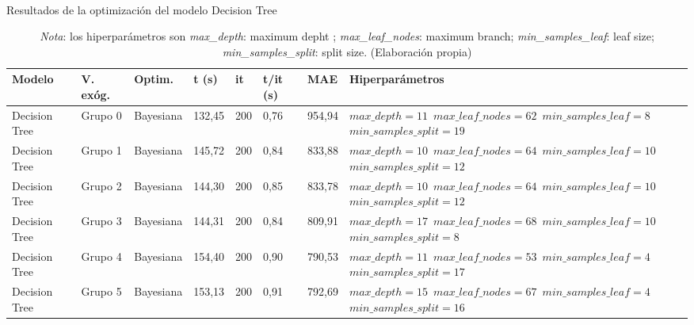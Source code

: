 \documentclass[12pt,a4paper]{report}
\begin{document}
\begin{table}[H]
\centering
\caption{\\ Resultados de la optimización del modelo Decision Tree}
\scriptsize
\begin{tabular}{m{1cm} m{1.2cm} m{1.2cm} m{1cm} m{1cm} m{1.2cm} m{1.2cm} m{3.5cm}} 
\toprule
\textbf{Modelo} & \textbf{V. exóg.} & \textbf{Optim.} & \textbf{t (s)} & \textbf{it} & \textbf{t/it (s)} & \textbf{MAE} & \textbf{Hiperparámetros} \\
\midrule
Decision Tree   & Grupo 0 & Bayesiana & 132,45 & 200 & 0,76 & 954,94 & \texttt{$max\_depth=11$ \newline $max\_leaf\_nodes = 62$  \newline $min\_samples\_leaf = 8$ \newline $min\_samples\_split = 19 $} \\[0.5em]
\hline
Decision Tree   & Grupo 1 & Bayesiana & 145,72 & 200 & 0,84 & 833,88 & \texttt{$max\_depth=10$ \newline $max\_leaf\_nodes=64$ \newline $min\_samples\_leaf=10$ \newline $min\_samples\_split=12$} \\[0.5em]
\hline
Decision Tree   & Grupo 2 & Bayesiana & 144,30 & 200 & 0,85 & 833,78 & \texttt{$max\_depth=10$ \newline $max\_leaf\_nodes=64$ \newline $min\_samples\_leaf=10$ \newline $min\_samples\_split=12$} \\[0.5em]
\hline
Decision Tree   & Grupo 3 & Bayesiana & 144,31 & 200 & 0,84 & 809,91 & \texttt{$max\_depth=17$ \newline $max\_leaf\_nodes=68$ \newline $min\_samples\_leaf=10$ \newline $min\_samples\_split=8$} \\[0.5em]
\hline
Decision Tree   & Grupo 4 & Bayesiana & 154,40 & 200 & 0,90 & 790,53 & \texttt{$max\_depth=11$ \newline $max\_leaf\_nodes=53$ \newline $min\_samples\_leaf=4$ \newline $min\_samples\_split=17$} \\[0.5em]
\hline
Decision Tree   & Grupo 5 & Bayesiana & 153,13 & 200 & 0,91 & 792,69 & \texttt{$max\_depth=15$ \newline $max\_leaf\_nodes=67$ \newline $min\_samples\_leaf=4$ \newline $min\_samples\_split=16$} \\
\bottomrule
\end{tabular}
\label{tab:resultados_optimizacion}
\caption*{\textit{Nota}: los hiperparámetros son \textit{max\_depth}: maximum depht ; \textit{max\_leaf\_nodes}: maximum branch; \textit{min\_samples\_leaf}: leaf size; \textit{min\_samples\_split}: split size. (Elaboración propia)}
\end{table}
\end{document}
